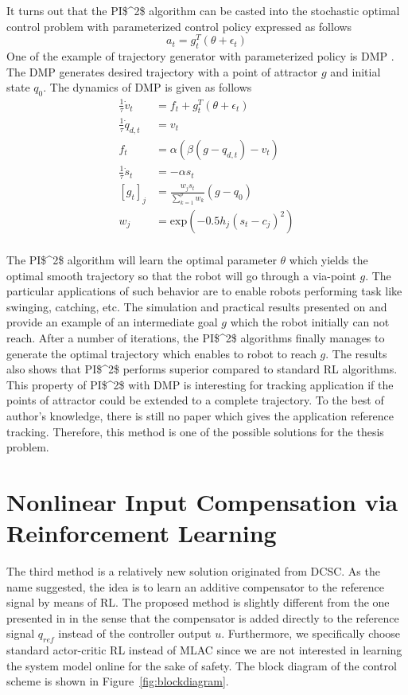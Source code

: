 It turns out that the \ac{PI$^2$} algorithm can be casted into the stochastic optimal control problem with parameterized control policy expressed as follows
\begin{equation}
a_t = g_t^T(\theta+\epsilon_t)
\end{equation}
One of the example of trajectory generator with parameterized policy is \ac {DMP} \cite{ijspeert2002learning}. The \ac{DMP} generates desired trajectory with a point of attractor $g$ and initial state $q_0$. The dynamics of \ac {DMP} is given as follows
\begin{align}
\frac{1}{\tau} \dot{v}_t &= f_t + g^T_t(\theta+\epsilon_t) \\
\frac{1}{\tau} \dot{q}_{d,t} &= v_t \\
f_t &= \alpha(\beta(g-q_{d,t})-v_t)\\
\frac{1}{\tau}\dot{s}_t &= -\alpha s_t\\
[g_t]_j &= \frac{w_js_t}{\sum_{k=1}^{p}w_k}(g-q_0)\\
w_j &= \text{exp}(-0.5h_j(s_t-c_j)^2)\\
\end{align}

The \ac{PI$^2$} algorithm will learn the optimal parameter $\theta$ which yields the optimal smooth trajectory so that the robot will go through a via-point $g$. The particular applications of such behavior are to enable robots performing task like swinging, catching, etc. The simulation and practical results presented on \cite{Buchli2010} and \cite{Buchli6037312} provide an example of an intermediate goal $g$ which the robot initially can not reach. After a number of iterations, the \ac{PI$^2$} algorithms finally manages to generate the optimal trajectory which enables to robot to reach $g$. The results also shows that \ac{PI$^2$} performs superior compared to standard \ac {RL} algorithms. This property of \ac{PI$^2$} with \ac {DMP} is interesting for tracking application if the points of attractor could be extended to a complete trajectory. To the best of author's knowledge, there is still no paper which gives the application reference tracking. Therefore, this method is one of the possible solutions for the thesis problem.

\section{Nonlinear Input Compensation via Reinforcement Learning} \label{sec:nl_comp}
The third method is a relatively new solution originated from \ac {DCSC}. As the name suggested, the idea is to learn an additive compensator to the reference signal by means of \ac{RL}. The proposed method is slightly different from the one presented in \cite{Efe2014} in the sense that the compensator is added directly to the reference signal $q_{ref}$ instead of the controller output $ u $. Furthermore, we specifically choose standard actor-critic \ac{RL} instead of \ac{MLAC} since we are not interested in learning the system model online for the sake of safety. The block diagram of the control scheme is shown in Figure~\ref{fig:blockdiagram}. 

